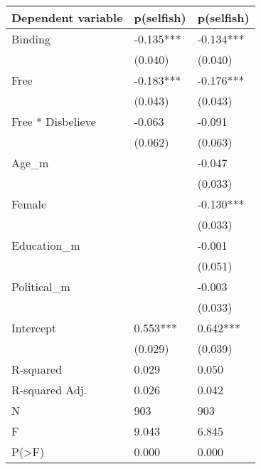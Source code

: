 \begin{tabular}{lll}
\toprule
Dependent variable & p(selfish) & p(selfish) \\
\midrule
Binding           &  -0.135*** &  -0.134*** \\
                  &    (0.040) &    (0.040) \\
Free              &  -0.183*** &  -0.176*** \\
                  &    (0.043) &    (0.043) \\
Free * Disbelieve &     -0.063 &     -0.091 \\
                  &    (0.062) &    (0.063) \\
Age\_m             &            &     -0.047 \\
                  &            &    (0.033) \\
Female            &            &  -0.130*** \\
                  &            &    (0.033) \\
Education\_m       &            &     -0.001 \\
                  &            &    (0.051) \\
Political\_m       &            &     -0.003 \\
                  &            &    (0.033) \\
Intercept         &   0.553*** &   0.642*** \\
                  &    (0.029) &    (0.039) \\
R-squared         &      0.029 &      0.050 \\
R-squared Adj.    &      0.026 &      0.042 \\
N                 &        903 &        903 \\
F                 &      9.043 &      6.845 \\
P(>F)             &      0.000 &      0.000 \\
\bottomrule
\end{tabular}
